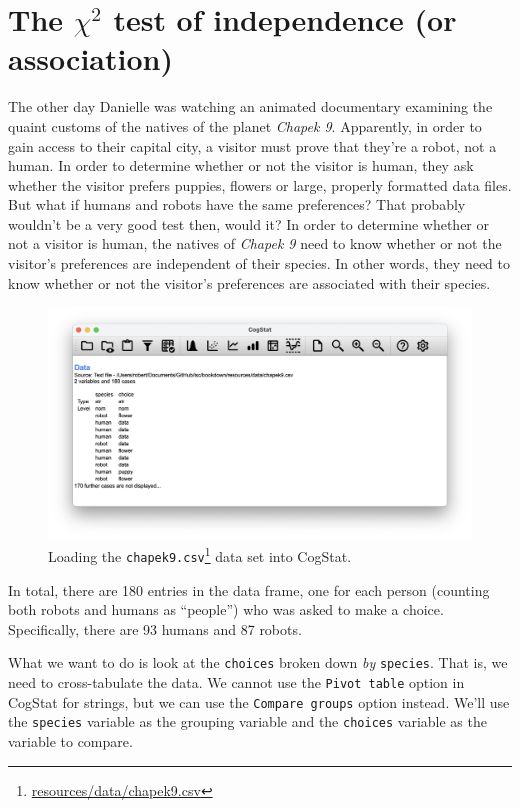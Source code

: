\documentclass[
  11pt,
  a4paper,
  twoside,symmetric,openright]{book}
\theoremstyle{break}
\theoremstyle{break}
\DeclareRobustCommand{\href}[2]{#2\footnote{\url{#1}}}
\begin{document}
\section{\texorpdfstring{The \(\chi^2\) test of independence (or association)}{The \textbackslash chi\^{}2 test of independence (or association)}}\label{chisqindependence}

The other day Danielle was watching an animated documentary examining the quaint customs of the natives of the planet \emph{Chapek 9}. Apparently, in order to gain access to their capital city, a visitor must prove that they're a robot, not a human. In order to determine whether or not the visitor is human, they ask whether the visitor prefers puppies, flowers or large, properly formatted data files. But what if humans and robots have the same preferences? That probably wouldn't be a very good test then, would it? In order to determine whether or not a visitor is human, the natives of \emph{Chapek 9} need to know whether or not the visitor's preferences are independent of their species. In other words, they need to know whether or not the visitor's preferences are associated with their species.



\begin{figure}

{\centering \includegraphics[width=0.6\linewidth]{resources/image/cogstatloadchapek9} 

}

\caption{Loading the \href{resources/data/chapek9.csv}{\texttt{chapek9.csv}} data set into CogStat.}\label{fig:cogstatloadchapek9}
\end{figure}

In total, there are 180 entries in the data frame, one for each person (counting both robots and humans as ``people'') who was asked to make a choice. Specifically, there are 93 humans and 87 robots.

What we want to do is look at the \texttt{choices} broken down \emph{by} \texttt{species}. That is, we need to cross-tabulate the data. We cannot use the \texttt{Pivot\ table} option in CogStat for strings, but we can use the \texttt{Compare\ groups} option instead. We'll use the \texttt{species} variable as the grouping variable and the \texttt{choices} variable as the variable to compare.
\end{document}

